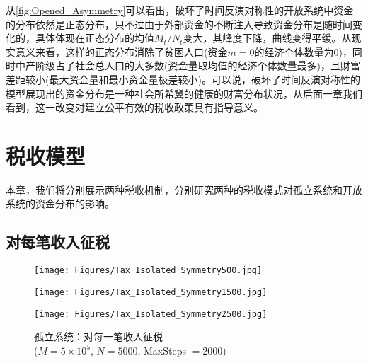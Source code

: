 \documentclass[tsinghuacite]{HustGraduPaper}
\begin{document}
		从\autoref{fig:Opened_Asymmetry}可以看出，破坏了时间反演对称性的开放系统中资金的分布依然是正态分布，只不过由于外部资金的不断注入导致资金分布是随时间变化的，具体体现在正态分布的均值$M_t/N_t$变大，其峰度下降，曲线变得平缓。从现实意义来看，这样的正态分布消除了贫困人口(资金$m=0$的经济个体数量为0)，同时中产阶级占了社会总人口的大多数(资金量取均值的经济个体数量最多)，且财富差距较小(最大资金量和最小资金量极差较小)。可以说，破坏了时间反演对称性的模型展现出的资金分布是一种社会所希冀的健康的财富分布状况，从后面一章我们看到，这一改变对建立公平有效的税收政策具有指导意义。




	\newpage
	
	\section{税收模型}\label{sec:tax_model}
	
	本章，我们将分别展示两种税收机制，分别研究两种的税收模式对孤立系统和开放系统的资金分布的影响。
	
		\subsection{对每笔收入征税}
		
		\begin{figure}[htbp]
			\centering                                                 
			\begin{minipage}[t]{0.49\textwidth}                                                      
			\texttt{[image: Figures/Tax\_Isolated\_Symmetry500.jpg]}               
			\end{minipage}
			\begin{minipage}[t]{0.49\textwidth}                 
			\texttt{[image: Figures/Tax\_Isolated\_Symmetry1500.jpg]}               
			\end{minipage}
			
			\begin{minipage}[t]{0.49\textwidth}                 
			\texttt{[image: Figures/Tax\_Isolated\_Symmetry2500.jpg]}               
			\end{minipage}

			\caption{孤立系统：对每一笔收入征税 \\ ($M = 5 \times 10^5$, $N = 5000$, MaxSteps $= 2000$)} 
			\label{fig:Tax_Isolated_Symmetry}                                                        
		\end{figure}
		
\end{document}
